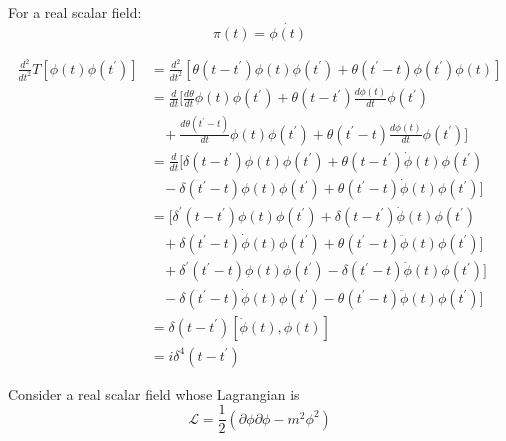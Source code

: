 \documentclass[12pt, letterpaper]{article}
\newcommand*{\1}{\hspace{1pt}}
\begin{document}
    For a real scalar field:
    \begin{equation*}
        \pi(t) = \dot{\phi(t)}
    \end{equation*}

    \begin{equation}
        \begin{split}
            \frac{d^2 }{d t^2}T[\phi (t) \phi (t^{\prime})] & = \frac{d^2 }{d t^2}[\theta (t-t^{\prime})\phi (t) \phi (t^{\prime}) + \theta (t^{\prime} -t) \phi(t^{\prime}) \phi (t)] \\
            & =  \frac{d}{d t}[\frac{d \theta}{d t}\phi (t) \phi (t^{\prime}) + \theta (t-t^{\prime})\frac{d \phi (t)}{dt}\phi (t^{\prime}) \\
            & \ \ \ \ + \frac{d\theta (t^{\prime} -t)}{dt}\phi (t) \phi (t^{\prime}) + \theta (t^{\prime} -t) \frac{d\phi(t)}{dt} \phi(t^{\prime})] \\
            & =  \frac{d}{d t}[\delta(t-t^{\prime})\phi (t) \phi (t^{\prime}) + \theta (t-t^{\prime})\dot{\phi} (t)\phi (t^{\prime}) \\
            & \ \ \ \ - \delta (t^{\prime} -t) \phi (t) \phi (t^{\prime})  +\theta (t^{\prime} -t) \dot{\phi}(t) \phi(t^{\prime})] \\
            & =  [\delta ^{\prime}(t-t^{\prime})\phi (t) \phi (t^{\prime}) + \delta (t-t^{\prime})\dot{\phi} (t)\phi (t^{\prime}) \\
            & \ \ \ \ + \delta (t^{\prime} -t) \dot{\phi} (t) \phi (t^{\prime}) + \theta (t^{\prime} -t) \ddot{\phi}(t) \phi(t^{\prime})] \\
            & \ \ \ \ + \delta ^{\prime} (t^{\prime} -t) \phi (t) \phi (t^{\prime}) - \delta (t^{\prime} -t) \dot{\phi}(t) \phi(t^{\prime})] \\
            & \ \ \ \ - \delta (t^{\prime} -t) \dot{\phi} (t) \phi (t^{\prime}) - \theta (t^{\prime} -t) \ddot{\phi}(t) \phi(t^{\prime})] \\
            & = \delta (t-t^{\prime})[\dot{\phi} (t), \phi (t)] \\
            & = i \delta ^{4} (t-t^{\prime})
        \end{split}
    \end{equation}

    Consider a real scalar field whose Lagrangian is
    \begin{equation}
        \mathcal{L}  = \frac{1}{2} (\partial \phi \partial \phi - m^{2} \phi ^{2})
    \end{equation}
\end{document}
